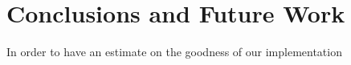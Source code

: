 \section{Conclusions and Future Work}
\label{conclusion}
%
%
%
%
%
%
%

In order to have an estimate on the goodness of our implementation